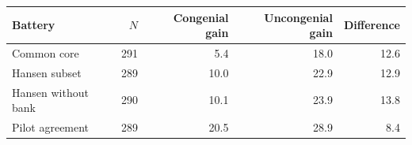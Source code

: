 \begin{tabular}{lrrrr}
\toprule
Battery & $N$ & Congenial gain & Uncongenial gain & Difference \\
\midrule
Common core & 291 & 5.4 & 18.0 & 12.6 \\
Hansen subset & 289 & 10.0 & 22.9 & 12.9 \\
Hansen without bank & 290 & 10.1 & 23.9 & 13.8 \\
Pilot agreement & 289 & 20.5 & 28.9 & 8.4 \\
\bottomrule
\end{tabular}
